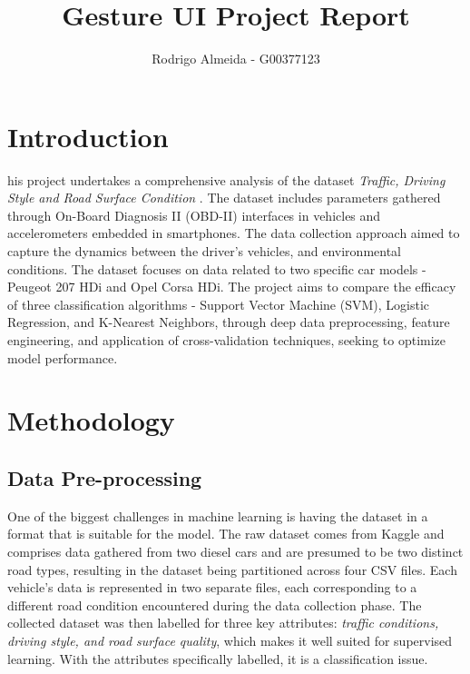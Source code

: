 \documentclass[10pt,journal,compsoc]{IEEEtran}
\begin{document}

\title{Gesture UI Project Report}

\author{Rodrigo Almeida - G00377123%
}

%
{}

\maketitle

\section{Introduction}
\label{sec:introduction}

his project undertakes a comprehensive analysis of the dataset \textit{Traffic, Driving Style and Road Surface Condition} \cite{dataset}. The dataset includes parameters gathered through On-Board Diagnosis II (OBD-II) interfaces in vehicles and accelerometers embedded in smartphones. The data collection approach aimed to capture the dynamics between the driver's vehicles, and
environmental conditions. The dataset focuses on data related to two specific car models - Peugeot 207 HDi and Opel Corsa HDi.
The project aims to compare the efficacy of three classification algorithms - Support Vector Machine (SVM), Logistic Regression, and K-Nearest Neighbors, through deep data preprocessing, 
feature engineering, and application of cross-validation techniques, seeking to optimize model performance.


\section{Methodology}

\subsection{Data Pre-processing}

One of the biggest challenges in machine learning is having the dataset in a format that is suitable for the model. The raw dataset comes from Kaggle \cite{dataset} 
and comprises data gathered from two diesel cars and are presumed to be two distinct road types, resulting in the dataset being partitioned across four CSV files. 
Each vehicle's data is represented in two separate files, each corresponding to a different road condition encountered during the data collection phase. The collected dataset was then labelled for three key attributes: 
\textit{traffic conditions, driving style, and road surface quality}, which makes it well suited for supervised learning. With the attributes specifically labelled, it is a classification issue. 
\end{document}
